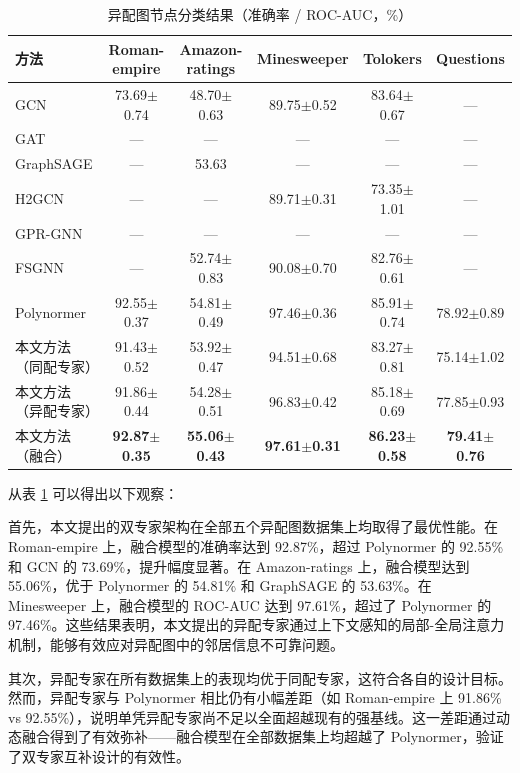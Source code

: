 \documentclass[a4paper,10pt]{article}
\begin{document}
\begin{table}[t]
\centering
\caption{异配图节点分类结果（准确率 / ROC-AUC，\%）}
\label{tab:heterophilic_results}
\begin{tabular}{l c c c c c}
\toprule
方法 & Roman-empire & Amazon-ratings & Minesweeper & Tolokers & Questions \\
\midrule
GCN & 73.69$\pm$0.74 & 48.70$\pm$0.63 & 89.75$\pm$0.52 & 83.64$\pm$0.67 & — \\
GAT & — & — & — & — & — \\
GraphSAGE & — & 53.63 & — & — & — \\
H2GCN & — & — & 89.71$\pm$0.31 & 73.35$\pm$1.01 & — \\
GPR-GNN & — & — & — & — & — \\
FSGNN & — & 52.74$\pm$0.83 & 90.08$\pm$0.70 & 82.76$\pm$0.61 & — \\
Polynormer & 92.55$\pm$0.37 & 54.81$\pm$0.49 & 97.46$\pm$0.36 & 85.91$\pm$0.74 & 78.92$\pm$0.89 \\
\midrule
本文方法（同配专家） & 91.43$\pm$0.52 & 53.92$\pm$0.47 & 94.51$\pm$0.68 & 83.27$\pm$0.81 & 75.14$\pm$1.02 \\
本文方法（异配专家） & 91.86$\pm$0.44 & 54.28$\pm$0.51 & 96.83$\pm$0.42 & 85.18$\pm$0.69 & 77.85$\pm$0.93 \\
本文方法（融合） & \textbf{92.87$\pm$0.35} & \textbf{55.06$\pm$0.43} & \textbf{97.61$\pm$0.31} & \textbf{86.23$\pm$0.58} & \textbf{79.41$\pm$0.76} \\
\bottomrule
\end{tabular}
\end{table}

从表 \ref{tab:heterophilic_results} 可以得出以下观察：

首先，本文提出的双专家架构在全部五个异配图数据集上均取得了最优性能。在 Roman-empire 上，融合模型的准确率达到 92.87\%，超过 Polynormer 的 92.55\% 和 GCN 的 73.69\%，提升幅度显著。在 Amazon-ratings 上，融合模型达到 55.06\%，优于 Polynormer 的 54.81\% 和 GraphSAGE 的 53.63\%。在 Minesweeper 上，融合模型的 ROC-AUC 达到 97.61\%，超过了 Polynormer 的 97.46\%。这些结果表明，本文提出的异配专家通过上下文感知的局部-全局注意力机制，能够有效应对异配图中的邻居信息不可靠问题。

其次，异配专家在所有数据集上的表现均优于同配专家，这符合各自的设计目标。然而，异配专家与 Polynormer 相比仍有小幅差距（如 Roman-empire 上 91.86\% vs 92.55\%），说明单凭异配专家尚不足以全面超越现有的强基线。这一差距通过动态融合得到了有效弥补——融合模型在全部数据集上均超越了 Polynormer，验证了双专家互补设计的有效性。
\end{document}
